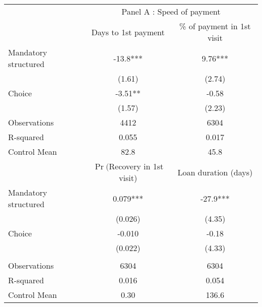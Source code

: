 \begin{tabular}{lcc}
\toprule
      & \multicolumn{2}{c}{Panel A  : Speed of payment} \\
\cmidrule{2-3}      & Days to 1st payment & \% of payment in 1st visit \\
\midrule
\midrule
Mandatory structured & -13.8*** & 9.76*** \\
      & (1.61) & (2.74) \\
Choice  & -3.51** & -0.58 \\
      & (1.57) & (2.23) \\
\midrule
Observations & 4412  & 6304 \\
R-squared & 0.055 & 0.017 \\
Control Mean & 82.8  & 45.8 \\
\midrule
\midrule
      & $\Pr($Recovery in 1st visit) & Loan duration (days) \\
\midrule
\midrule
Mandatory structured & 0.079*** & -27.9*** \\
      & (0.026) & (4.35) \\
Choice & -0.010 & -0.18 \\
      & (0.022) & (4.33) \\
      &       &  \\
\midrule
Observations & 6304  & 6304 \\
R-squared & 0.016 & 0.054 \\
Control Mean & 0.30  & 136.6 \\
\bottomrule
\bottomrule
\end{tabular}%
